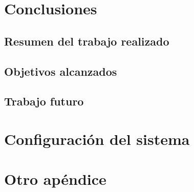 \documentclass[11pt,spanish,listoffigures,listoftables]{tfgetsinf}
\begin{document}

\chapter{Conclusiones}  %

\section{Resumen del trabajo realizado} %

\section{Objetivos alcanzados}         %

\section{Trabajo futuro}               %


\printbibliography 
\cleardoublepage


\APPENDIX

\chapter{Configuración del sistema}

\chapter{Otro apéndice}
\end{document}
